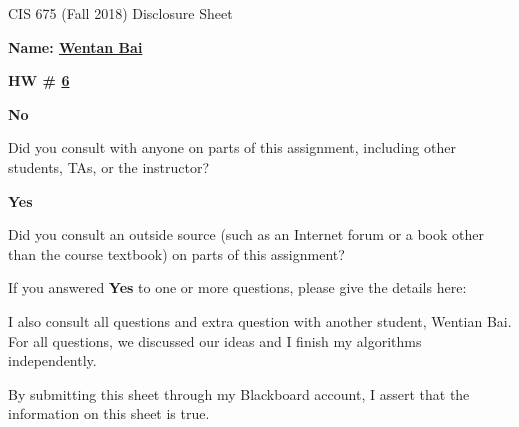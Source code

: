 \documentclass[12pt]{article}
\newcommand*\circled[1]{\tikz[baseline=(char.base)]{
            \node[shape=circle,draw,inner sep=2pt] (char) {#1};}}
\begin{document}
\begin{center}
  \Large
  CIS 675 (Fall 2018) Disclosure Sheet 
\end{center} 
\vspace*{2em}

\noindent
\textbf{\Large Name: \underline{ Wentan Bai }} 


\noindent 
\begin{minipage}[t]{1.0\linewidth}

\begin{minipage}[t]{0.25\linewidth}
\textbf{\Large
  HW \# \underline{ 6 }
} 

\end{minipage} \vspace*{3ex}




\begin{minipage}[t]{.8in}
  \textbf{\circled{Yes} \quad No}
\end{minipage}
\qquad 
\begin{minipage}[t]{5.5in}
  Did you consult with anyone on parts of this assignment, including other students, TAs, or the instructor? 
\end{minipage}
\vspace*{1ex}

\begin{minipage}[t]{.8in}
  \textbf{Yes \quad \circled{No}}
\end{minipage}
\qquad 
\begin{minipage}[t]{5.5in}
  Did you consult an outside source (such as an Internet forum or a
  book other than the course textbook) on parts of this assignment? 
\end{minipage}
\vspace*{1ex}

\noindent
  If you answered \textbf{Yes} to one or more questions, please give the details here: \vspace*{5ex} \par
  I also consult all questions and extra question with another student, Wentian Bai. For all questions, we discussed our ideas and I finish my algorithms independently. 


\vfill
\end{minipage}



\vspace*{40ex}

By submitting this sheet through my Blackboard account, I assert that the information on this sheet is true.
\end{document}
